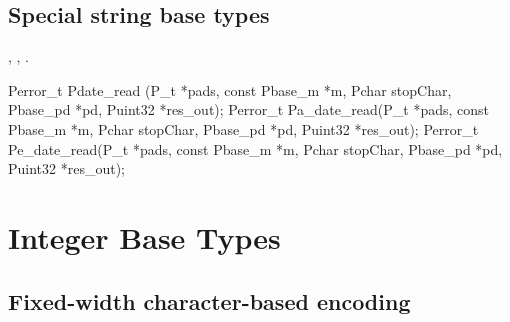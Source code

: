 \subsection{Special string base types}

\aedBegin{}
, , .
\aedEnd{}

\begin{tinycodeaux}{\leftmargin=0in}
Perror_t Pdate_read  (P_t *pads, const Pbase_m *m, Pchar stopChar,
		      Pbase_pd *pd, Puint32 *res_out);
Perror_t Pa_date_read(P_t *pads, const Pbase_m *m, Pchar stopChar,
		      Pbase_pd *pd, Puint32 *res_out);
Perror_t Pe_date_read(P_t *pads, const Pbase_m *m, Pchar stopChar,
		      Pbase_pd *pd, Puint32 *res_out);
\end{tinycodeaux}

\section{Integer Base Types}

\subsection{Fixed-width character-based encoding}

\aedBegin{}
\aedEnd{}

